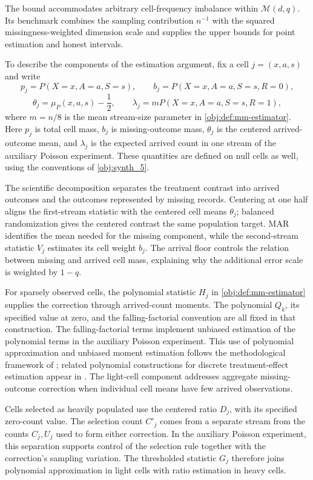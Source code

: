 The bound accommodates arbitrary cell-frequency imbalance within \(\mathcal M(d,q)\). Its benchmark combines the sampling contribution \(n^{-1}\) with the squared missingness-weighted dimension scale and supplies the upper bounds for point estimation and honest intervals.

To describe the components of the estimation argument, fix a cell \(j=(x,a,s)\) and write
\[
p_j=P(X=x,A=a,S=s),\qquad
b_j=P(X=x,A=a,S=s,R=0),
\]
\[
\theta_j=\mu_P(x,a,s)-\frac12,\qquad
\lambda_j=mP(X=x,A=a,S=s,R=1),
\]
where \(m=n/8\) is the mean stream-size parameter in \cref{obj:def:mm-estimator}. Here \(p_j\) is total cell mass, \(b_j\) is missing-outcome mass, \(\theta_j\) is the centered arrived-outcome mean, and \(\lambda_j\) is the expected arrived count in one stream of the auxiliary Poisson experiment. These quantities are defined on null cells as well, using the conventions of \cref{obj:synth_5}.

The scientific decomposition separates the treatment contrast into arrived outcomes and the outcomes represented by missing records. Centering at one half aligns the first-stream statistic with the centered cell means \(\theta_j\); balanced randomization gives the centered contrast the same population target. MAR identifies the mean needed for the missing component, while the second-stream statistic \(V_j\) estimates its cell weight \(b_j\). The arrival floor controls the relation between missing and arrived cell mass, explaining why the additional error scale is weighted by \(1-q\).

For sparsely observed cells, the polynomial statistic \(H_j\) in \cref{obj:def:mm-estimator} supplies the correction through arrived-count moments. The polynomial \(Q_k\), its specified value at zero, and the falling-factorial convention are all fixed in that construction. The falling-factorial terms implement unbiased estimation of the polynomial terms in the auxiliary Poisson experiment. This use of polynomial approximation and unbiased moment estimation follows the methodological framework of \citet[Sections~III--IV]{JiaoVenkatHanWeissman2015}; related polynomial constructions for discrete treatment-effect estimation appear in \citet{CausalSmith2026,CausalSmith2026Annotation}. The light-cell component addresses aggregate missing-outcome correction when individual cell means have few arrived observations.

Cells selected as heavily populated use the centered ratio \(D_j\), with its specified zero-count value. The selection count \(C'_j\) comes from a separate stream from the counts \(C_j,U_j\) used to form either correction. In the auxiliary Poisson experiment, this separation supports control of the selection rule together with the correction's sampling variation. The thresholded statistic \(G_j\) therefore joins polynomial approximation in light cells with ratio estimation in heavy cells.


